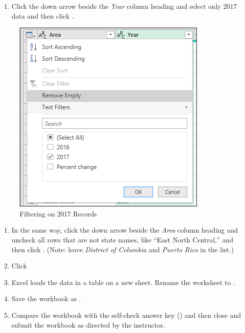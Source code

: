 \begin{enumerate}[resume]
	\item Click the down arrow beside the \textit{Year} column heading and select only $ 2017 $ data and then click .
\end{enumerate}

\begin{figure}[H]
	\centering
	\includegraphics[width=\maxwidth{.75\linewidth}]{gfx/ch07_fig02f}
	\caption{Filtering on 2017 Records}
	\label{07:fig02f}
\end{figure}

\begin{enumerate}[resume]
	\item In the same way, click the down arrow beside the \textit{Area} column heading and uncheck all rows that are not state names, like ``East North Central,'' and then click . (Note: leave \textit{District of Columbia} and \textit{Puerto Rico} in the list.)
	\item Click 
	\item Excel loads the data in a table on a new sheet. Rename the worksheet to .
	\item Save the workbook as .
	\item Compare the workbook with the self-check answer key () and then close and submit the  workbook as directed by the instructor.

\end{enumerate}

